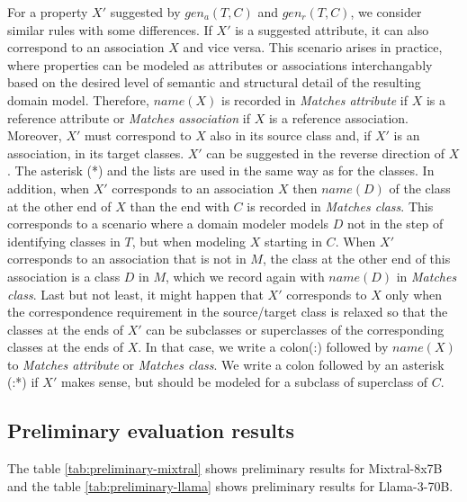 For a property $X'$ suggested by $gen_a(T,C)$ and $gen_r(T,C)$, we consider similar rules with some differences.
If $X'$ is a suggested attribute, it can also correspond to an association $X$ and vice versa.
This scenario arises in practice, where properties can be modeled as attributes or associations interchangably based on the desired level of semantic and structural detail of the resulting domain model.
Therefore, $name(X)$ is recorded in \emph{Matches attribute} if $X$ is a reference attribute or \emph{Matches association} if $X$ is a reference association.
Moreover, $X'$ must correspond to $X$ also in its source class and, if $X'$ is an association, in its target classes.
$X'$ can be suggested in the reverse direction of $X$.
The asterisk (*) and the lists are used in the same way as for the classes.
In addition, when $X'$ corresponds to an association $X$ then $name(D)$ of the class at the other end of $X$ than the end with $C$ is recorded in \emph{Matches class}.
This corresponds to a scenario where a domain modeler models $D$ not in the step of identifying classes in $T$, but when modeling $X$ starting in $C$.
When $X'$ corresponds to an association that is not in $M$, the class at the other end of this association is a class $D$ in $M$, which we record again with $name(D)$ in \emph{Matches class}.
Last but not least, it might happen that $X'$ corresponds to $X$ only when the correspondence requirement in the source/target class is relaxed so that the classes at the ends of $X'$ can be subclasses or superclasses of the corresponding classes at the ends of $X$.
In that case, we write a colon(:) followed by $name(X)$ to \emph{Matches attribute} or \emph{Matches class}.
We write a colon followed by an asterisk (:*) if $X'$ makes sense, but should be modeled for a subclass of superclass of $C$.


\subsection{Preliminary evaluation results}

The table \ref{tab:preliminary-mixtral} shows preliminary results for Mixtral-8x7B and the table \ref{tab:preliminary-llama} shows preliminary results for Llama-3-70B.

